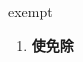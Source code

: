 
\begin{frame}
{\huge exempt}
\begin{center}
\begin{enumerate}\Large
  \item \textbf{使免除}
\end{enumerate}
\end{center}
\end{frame}

